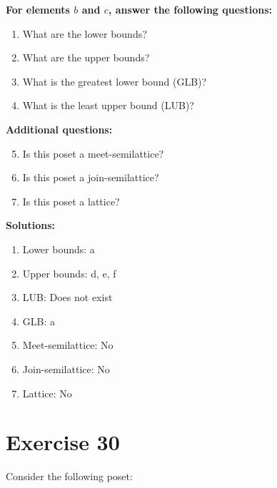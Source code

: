 \documentclass{article}
\begin{document}
    \textbf{For elements $b$ and $c$, answer the following questions:}
\begin{enumerate}
    \item What are the lower bounds?
    \item What are the upper bounds?
    \item What is the greatest lower bound (GLB)?
    \item What is the least upper bound (LUB)?
\end{enumerate}
    \hspace*{3ex} \textbf{Additional questions:}
\begin{enumerate}
    \setcounter{enumi}{4}
    \item Is this poset a meet-semilattice?
    \item Is this poset a join-semilattice?
    \item Is this poset a lattice?
\end{enumerate}

\textbf{Solutions:}
\begin{enumerate}
    \item Lower bounds: {a}
    \item Upper bounds: {d, e, f}
    \item LUB: Does not exist
    \item GLB: a
    \item Meet-semilattice: No
    \item Join-semilattice: No
    \item Lattice: No
\end{enumerate}
\newpage
\section*{Exercise 30}
Consider the following poset:
\begin{center}
\end{center}
\end{document}
